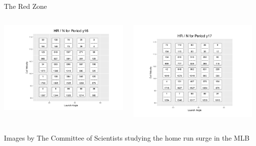 \documentclass[14pt]{bredelebeamer}
\begin{document}
\begin{frame}{The Red Zone}

\begin{columns}
\begin{column}{0.5\textwidth}
\includegraphics[scale = 0.6, trim = 2.2cm 0 0 0]{images/Committee_2016}
\end{column}
\begin{column}{0.6\textwidth}
\includegraphics[scale = 0.62, trim = 0.7cm 0 0 0]{images/Committee_2017}
\end{column}
\end{columns}
\begin{small}
\begin{center}
Images by The Committee of Scientists studying the home run surge in the MLB
\end{center}
\end{small}

\end{frame}
\end{document}
